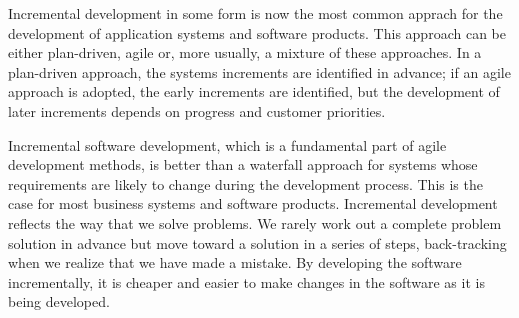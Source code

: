 Incremental development in some form is now the most common apprach for the development of application systems and software products. This approach can be either plan-driven, agile or, more usually, a mixture of these approaches. In a plan-driven approach, the systems increments are identified in advance; if an agile approach is adopted, the early increments are identified, but the development of later increments depends on progress and customer priorities.

Incremental software development, which is a fundamental part of agile development methods, is better than a waterfall approach for systems whose requirements are likely to change during the development process. This is the case for most business systems and software products. Incremental development reflects the way that we solve problems. We rarely work out a complete problem solution in advance but move toward a solution in a series of steps, back-tracking when we realize that we have made a mistake. By developing the software incrementally, it is cheaper and easier to make changes in the software as it is being developed.